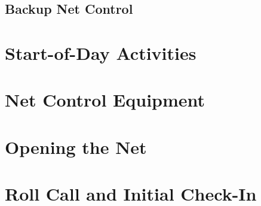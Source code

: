 \documentclass[pdflatex,letterpaper,twoside,12pt]{book}
\begin{document}
\subsection{Backup Net Control}

\iffalse %
Describe role, types of traffic, etc
\fi


\section{Start-of-Day Activities}

\iffalse %
Equipment checks, opening script, etc
...and is this the best placement for this section?
\fi


\section{Net Control Equipment}

\iffalse %
going forward things will be 
color coded.... For example. the Medical Repeater will have a red electrical 
tape ring on the antenna, coax, the radios, etc... (or something similar. they 
will also be labeled with Frequency and use ie: Medical 461.800
\fi %


\section{Opening the Net}


\section{Roll Call and Initial Check-In}

\end{document}
